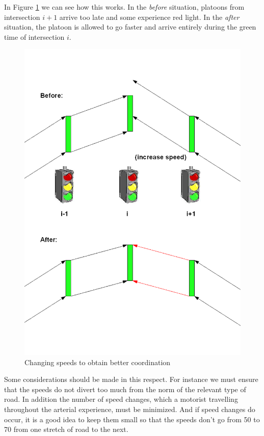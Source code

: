 In Figure \ref{fig:change_speed} we can see how this works. In the \textit{before} situation, platoons from intersection $i+1$ arrive too late and some experience red light. In the \textit{after} situation, the platoon is allowed to go faster and arrive entirely during the green time of intersection $i$.

\begin{figure}[ht]
\centering
\includegraphics[scale=0.2]{change_speed.png}
\caption{Changing speeds to obtain better coordination}
\label{fig:change_speed}
\end{figure}

Some considerations should be made in this respect. For instance we must ensure that the speeds do not divert too much from the norm of the relevant type of road. In addition the number of speed changes, which a motorist travelling throughout the arterial experience, must be minimized. And if speed changes do occur, it is a good idea to keep them small so that the speeds don't go from 50 to 70 from one stretch of road to the next.

